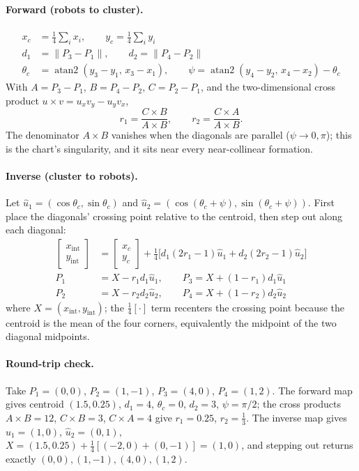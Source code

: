 \documentclass[12pt, letterpaper, oneside]{report}
\begin{document}
\paragraph{Forward (robots to cluster).}
\begin{align}
x_c &= \tfrac{1}{4}\textstyle\sum_i x_i, \qquad y_c = \tfrac{1}{4}\textstyle\sum_i y_i \\
d_1 &= \lVert P_3-P_1\rVert, \qquad d_2 = \lVert P_4-P_2\rVert \\
\theta_c &= \operatorname{atan2}(y_3-y_1,\,x_3-x_1), \qquad \psi = \operatorname{atan2}(y_4-y_2,\,x_4-x_2)-\theta_c
\end{align}
With $A=P_3-P_1$, $B=P_4-P_2$, $C=P_2-P_1$, and the two-dimensional cross
product $u\times v = u_xv_y - u_yv_x$,
\begin{equation}
r_1 = \frac{C\times B}{A\times B}, \qquad r_2 = \frac{C\times A}{A\times B}.
\end{equation}
The denominator $A\times B$ vanishes when the diagonals are parallel
($\psi\to0,\pi$); this is the chart's singularity, and it sits near every
near-collinear formation.

\paragraph{Inverse (cluster to robots).}
Let $\hat u_1=(\cos\theta_c,\sin\theta_c)$ and
$\hat u_2=(\cos(\theta_c+\psi),\sin(\theta_c+\psi))$. First place the
diagonals' crossing point relative to the centroid, then step out along
each diagonal:
\begin{align}
\begin{bmatrix} x_{\text{int}} \\ y_{\text{int}} \end{bmatrix}
  &= \begin{bmatrix} x_c \\ y_c \end{bmatrix}
  + \tfrac{1}{4}\Big[d_1(2r_1-1)\hat u_1 + d_2(2r_2-1)\hat u_2\Big] \\
P_1 &= X - r_1 d_1 \hat u_1, \qquad P_3 = X + (1-r_1)d_1\hat u_1 \\
P_2 &= X - r_2 d_2 \hat u_2, \qquad P_4 = X + (1-r_2)d_2\hat u_2
\end{align}
where $X=(x_{\text{int}},y_{\text{int}})$; the $\tfrac{1}{4}[\cdot]$ term
recenters the crossing point because the centroid is the mean of the four
corners, equivalently the midpoint of the two diagonal midpoints.

\paragraph{Round-trip check.} Take $P_1=(0,0)$, $P_2=(1,-1)$, $P_3=(4,0)$,
$P_4=(1,2)$. The forward map gives centroid $(1.5,0.25)$, $d_1=4$,
$\theta_c=0$, $d_2=3$, $\psi=\pi/2$; the cross products
$A\times B=12$, $C\times B=3$, $C\times A=4$ give $r_1=0.25$, $r_2=\tfrac13$.
The inverse map gives $\hat u_1=(1,0)$, $\hat u_2=(0,1)$,
$X=(1.5,0.25)+\tfrac14[(-2,0)+(0,-1)]=(1,0)$, and stepping out returns
exactly $(0,0),(1,-1),(4,0),(1,2)$.
\end{document}
